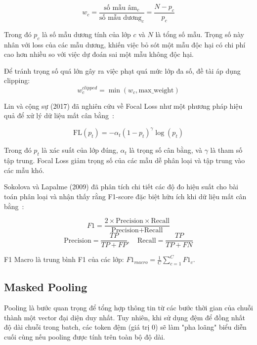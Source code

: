 \documentclass[../BTL.tex]{subfiles}
\begin{document}
\begin{equation}
    w_c = \frac{\text{số mẫu âm}_c}{\text{số mẫu dương}_c} = \frac{N - p_c}{p_c}
\end{equation}

Trong đó $p_c$ là số mẫu dương tính của lớp $c$ và $N$ là tổng số mẫu. Trọng số này nhân với loss của các mẫu dương, khiến việc bỏ sót một mẫu độc hại có chi phí cao hơn nhiều so với việc dự đoán sai một mẫu không độc hại.

Để tránh trọng số quá lớn gây ra việc phạt quá mức lớp đa số, đề tài áp dụng clipping:
\begin{equation}
    w_c^{clipped} = \min(w_c, \text{max\_weight})
\end{equation}

Lin và cộng sự (2017) đã nghiên cứu về Focal Loss như một phương pháp hiệu quả để xử lý dữ liệu mất cân bằng~\cite{lin2017focal}:

\begin{equation}
    \text{FL}(p_t) = -\alpha_t (1 - p_t)^\gamma \log(p_t)
\end{equation}

Trong đó $p_t$ là xác suất của lớp đúng, $\alpha_t$ là trọng số cân bằng, và $\gamma$ là tham số tập trung. Focal Loss giảm trọng số của các mẫu dễ phân loại và tập trung vào các mẫu khó.

Sokolova và Lapalme (2009) đã phân tích chi tiết các độ đo hiệu suất cho bài toán phân loại và nhận thấy rằng F1-score đặc biệt hữu ích khi dữ liệu mất cân bằng~\cite{sokolova2009systematic}:

\begin{equation}
    F1 = \frac{2 \times \text{Precision} \times \text{Recall}}{\text{Precision} + \text{Recall}}
\end{equation}
\begin{equation}
    \text{Precision} = \frac{TP}{TP + FP}, \quad \text{Recall} = \frac{TP}{TP + FN}
\end{equation}

F1 Macro là trung bình F1 của các lớp: $F1_{macro} = \frac{1}{C} \sum_{c=1}^{C} F1_c$.

\subsection{Masked Pooling}
Pooling là bước quan trọng để tổng hợp thông tin từ các bước thời gian của chuỗi thành một vector đại diện duy nhất. Tuy nhiên, khi sử dụng đệm để đồng nhất độ dài chuỗi trong batch, các token đệm (giá trị 0) sẽ làm "pha loãng" biểu diễn cuối cùng nếu pooling được tính trên toàn bộ độ dài.
\end{document}
